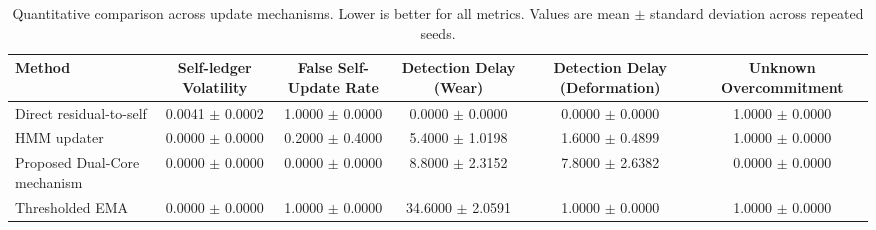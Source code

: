 \begin{table}[t]
\centering
\caption{Quantitative comparison across update mechanisms. Lower is better for all metrics. Values are mean $\pm$ standard deviation across repeated seeds.}
\label{tab:quantitative-comparison}
\begin{tabular}{lccccc}
\hline
Method & Self-ledger Volatility & False Self-Update Rate & Detection Delay (Wear) & Detection Delay (Deformation) & Unknown Overcommitment \\
\hline
Direct residual-to-self & 0.0041 $\pm$ 0.0002 & 1.0000 $\pm$ 0.0000 & 0.0000 $\pm$ 0.0000 & 0.0000 $\pm$ 0.0000 & 1.0000 $\pm$ 0.0000 \\
HMM updater & 0.0000 $\pm$ 0.0000 & 0.2000 $\pm$ 0.4000 & 5.4000 $\pm$ 1.0198 & 1.6000 $\pm$ 0.4899 & 1.0000 $\pm$ 0.0000 \\
Proposed Dual-Core mechanism & 0.0000 $\pm$ 0.0000 & 0.0000 $\pm$ 0.0000 & 8.8000 $\pm$ 2.3152 & 7.8000 $\pm$ 2.6382 & 0.0000 $\pm$ 0.0000 \\
Thresholded EMA & 0.0000 $\pm$ 0.0000 & 1.0000 $\pm$ 0.0000 & 34.6000 $\pm$ 2.0591 & 1.0000 $\pm$ 0.0000 & 1.0000 $\pm$ 0.0000 \\
\hline
\end{tabular}
\end{table}
